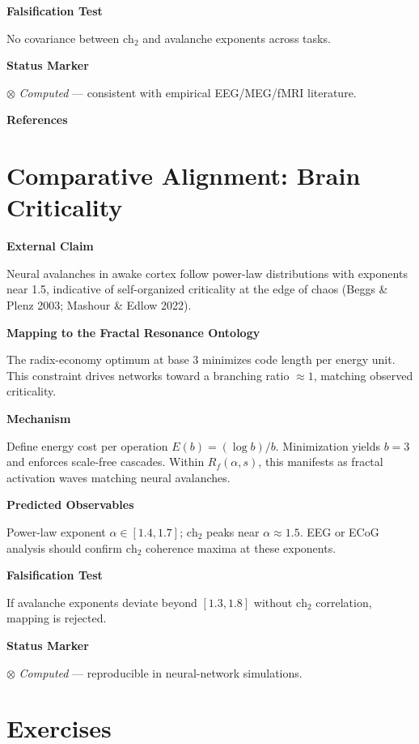 \textbf{Falsification Test}

No covariance between $\text{ch}_2$ and avalanche exponents across tasks.

\textbf{Status Marker}

$\otimes$ \textit{Computed} --- consistent with empirical EEG/MEG/fMRI literature.

\textbf{References}

\cite{beggs2003neuronal,bullmore2009complex,singer1999neuronal,logothetis2001neurophysiological}

\section{Comparative Alignment: Brain Criticality}

\textbf{External Claim}

Neural avalanches in awake cortex follow power-law distributions with exponents near 1.5, indicative of self-organized criticality at the edge of chaos (Beggs \& Plenz 2003; Mashour \& Edlow 2022).

\textbf{Mapping to the Fractal Resonance Ontology}

The radix-economy optimum at base 3 minimizes code length per energy unit.
This constraint drives networks toward a branching ratio $\approx 1$, matching observed criticality.

\textbf{Mechanism}

Define energy cost per operation $E(b) = (\log b)/b$.
Minimization yields $b = 3$ and enforces scale-free cascades.
Within $R_f(\alpha,s)$, this manifests as fractal activation waves matching neural avalanches.

\textbf{Predicted Observables}

Power-law exponent $\alpha \in [1.4, 1.7]$; $\text{ch}_2$ peaks near $\alpha \approx 1.5$.
EEG or ECoG analysis should confirm $\text{ch}_2$ coherence maxima at these exponents.

\textbf{Falsification Test}

If avalanche exponents deviate beyond $[1.3, 1.8]$ without $\text{ch}_2$ correlation, mapping is rejected.

\textbf{Status Marker}

$\otimes$ \textit{Computed} --- reproducible in neural-network simulations.

\section*{Exercises}

